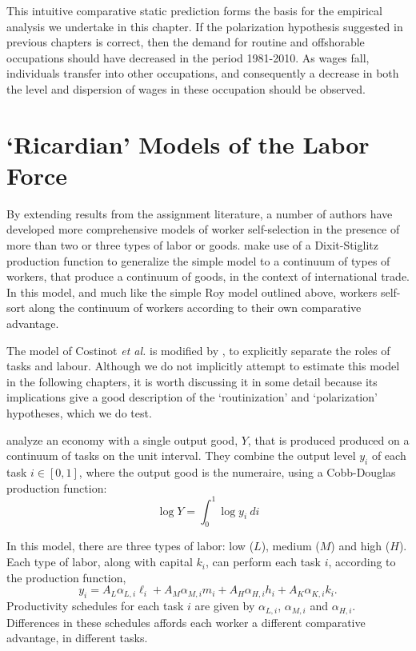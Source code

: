 This intuitive comparative static prediction forms the basis for the empirical analysis we undertake in this chapter. If the polarization hypothesis suggested in previous chapters is correct, then the demand for routine and offshorable occupations should have decreased in the period 1981-2010. As wages fall, individuals transfer into other occupations, and consequently a decrease in both the level and dispersion of wages in these occupation should be observed.

\section{`Ricardian' Models of the Labor Force}\label{sec:ricardo}

By extending results from the assignment literature, a number of authors have developed more comprehensive models of worker self-selection in the presence of more than two or three types of labor or goods. \citet{Costinot2010} make use of a Dixit-Stiglitz production function to generalize the simple \citet{Levy2003} model to a continuum of types of workers, that produce a continuum of goods, in the context of international trade. In this model, and much like the simple Roy model outlined above, workers self-sort along the continuum of workers according to their own comparative advantage.

The model of Costinot {\em et al.} is modified by \citet{Acemoglu2011}, to explicitly separate the roles of tasks and labour. Although we do not implicitly attempt to estimate this model in the following chapters, it is worth discussing it in some detail because its implications give a good description of the `routinization' and `polarization' hypotheses, which we do test.

\citet{Acemoglu2011} analyze an economy with a single output good, $Y$, that is produced produced on a continuum of tasks on the unit interval. They combine the output level $y_i$ of each task $i\in[0,1]$, where the output good is the numeraire, using a Cobb-Douglas production function:
$$
  \log Y = \int_0^1 \log y_i\ di
$$

In this model, there are three types of labor: low ($L$), medium ($M$) and high ($H$). Each type of labor, along with capital $k_i$, can perform each task $i$, according to the production function,
$$
y_i = A_L\alpha_{L,i}\ell_i + A_M\alpha_{M,i}m_i + A_H\alpha_{H,i}h_i + A_K\alpha_{K,i}k_i.
$$
Productivity schedules for each task $i$ are given by $\alpha_{L,i}$, $\alpha_{M,i}$ and $\alpha_{H,i}$. Differences in these schedules affords each worker a different comparative advantage, in different tasks.

